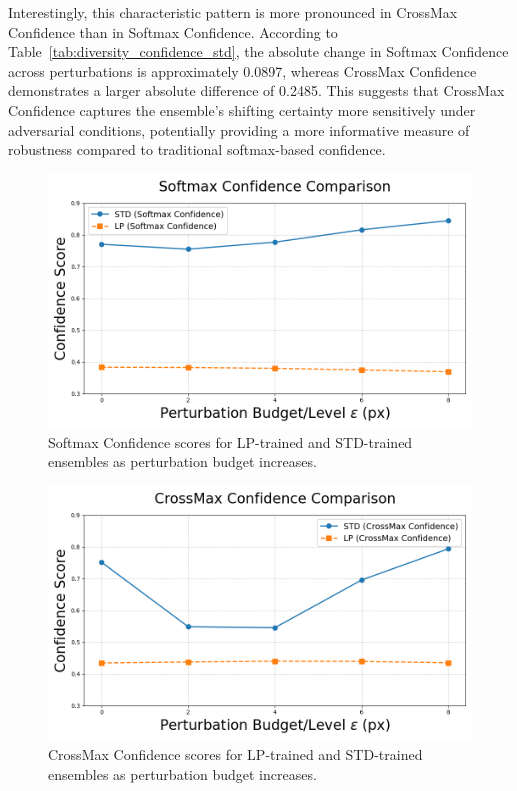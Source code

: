 Interestingly, this characteristic pattern is more pronounced in CrossMax Confidence than in Softmax Confidence. According to Table~\ref{tab:diversity_confidence_std}, the absolute change in Softmax Confidence across perturbations is approximately 0.0897, whereas CrossMax Confidence demonstrates a larger absolute difference of 0.2485. This suggests that CrossMax Confidence captures the ensemble’s shifting certainty more sensitively under adversarial conditions, potentially providing a more informative measure of robustness compared to traditional softmax-based confidence.



\begin{figure}[H]
    \centering
    \includegraphics[width=0.8\linewidth]{images/SoftMax Confidence.png}
    \caption{Softmax Confidence scores for LP-trained and STD-trained ensembles as perturbation budget increases.}
    \label{fig:softmax_confidence}
\end{figure}

\begin{figure}[H]
    \centering
    \includegraphics[width=0.8\linewidth]{images/CrossMax Confidence.png}
    \caption{CrossMax Confidence scores for LP-trained and STD-trained ensembles as perturbation budget increases.}
    \label{fig:crossmax_confidence}
\end{figure}


